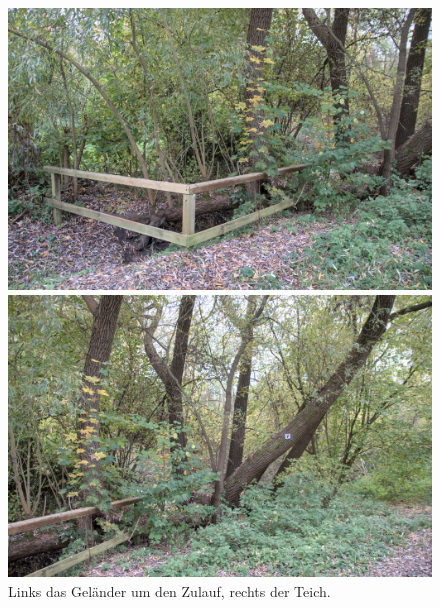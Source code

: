 \begin{figure}[h]
    \centering
    \begin{minipage}{.5\textwidth}
        \centering
        \includegraphics[width=.95\linewidth]{figures/geocaching/first/IMG_3101.jpg}
    \end{minipage}%
    \begin{minipage}{.5\textwidth}
        \centering
        \includegraphics[width=.95\linewidth]{figures/geocaching/first/IMG_3102.jpg}
    \end{minipage}
    \caption{Links das Geländer um den Zulauf, rechts der Teich.}
    \label{first-cache-gelaende}
\end{figure}


